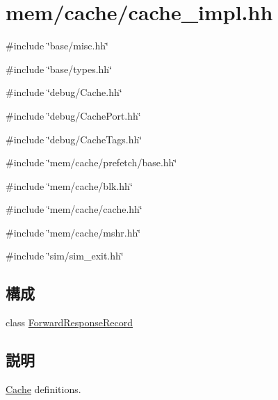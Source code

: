 \hypertarget{cache__impl_8hh}{
\section{mem/cache/cache\_\-impl.hh}
\label{cache__impl_8hh}
}
{\ttfamily \#include \char`\"{}base/misc.hh\char`\"{}}\par
{\ttfamily \#include \char`\"{}base/types.hh\char`\"{}}\par
{\ttfamily \#include \char`\"{}debug/Cache.hh\char`\"{}}\par
{\ttfamily \#include \char`\"{}debug/CachePort.hh\char`\"{}}\par
{\ttfamily \#include \char`\"{}debug/CacheTags.hh\char`\"{}}\par
{\ttfamily \#include \char`\"{}mem/cache/prefetch/base.hh\char`\"{}}\par
{\ttfamily \#include \char`\"{}mem/cache/blk.hh\char`\"{}}\par
{\ttfamily \#include \char`\"{}mem/cache/cache.hh\char`\"{}}\par
{\ttfamily \#include \char`\"{}mem/cache/mshr.hh\char`\"{}}\par
{\ttfamily \#include \char`\"{}sim/sim\_\-exit.hh\char`\"{}}\par
\subsection*{構成}
\begin{DoxyCompactItemize}
\item 
class \hyperlink{classForwardResponseRecord}{ForwardResponseRecord}
\end{DoxyCompactItemize}


\subsection{説明}
\hyperlink{classCache}{Cache} definitions. 